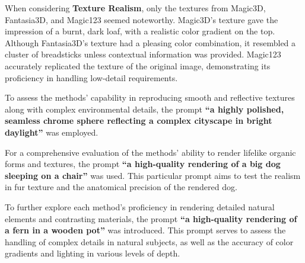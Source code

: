 When considering \textbf{Texture Realism}, only the textures from Magic3D, Fantasia3D, and Magic123 seemed noteworthy. Magic3D's texture gave the impression of a burnt, dark loaf, with a realistic color gradient on the top. Although Fantasia3D's texture had a pleasing color combination, it resembled a cluster of breadsticks unless contextual information was provided. Magic123 accurately replicated the texture of the original image, demonstrating its proficiency in handling low-detail requirements.

To assess the methods' capability in reproducing smooth and reflective textures along with complex environmental details, the prompt \textbf{``a highly polished, seamless chrome sphere reflecting a complex cityscape in bright daylight''} was employed.





For a comprehensive evaluation of the methods' ability to render lifelike organic forms and textures, the prompt \textbf{``a high-quality rendering of a big dog sleeping on a chair''} was used. This particular prompt aims to test the realism in fur texture and the anatomical precision of the rendered dog.





To further explore each method's proficiency in rendering detailed natural elements and contrasting materials, the prompt \textbf{``a high-quality rendering of a fern in a wooden pot''} was introduced. This prompt serves to assess the handling of complex details in natural subjects, as well as the accuracy of color gradients and lighting in various levels of depth.


